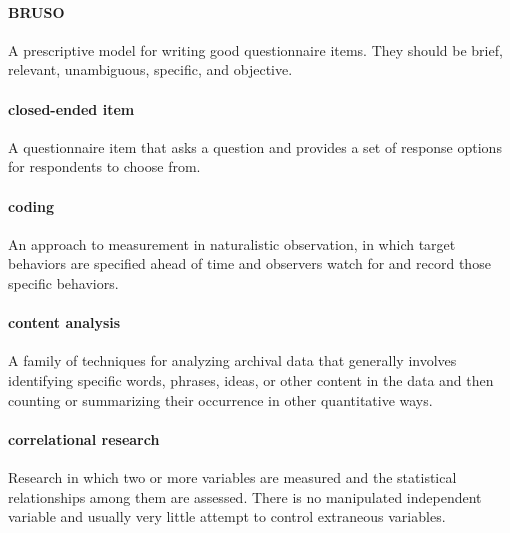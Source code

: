 \documentclass[
]{krantz}
\begin{document}
\hypertarget{bruso}{%
\paragraph*{BRUSO}\label{bruso}}

A prescriptive model for writing good questionnaire items. They should be brief, relevant, unambiguous, specific, and objective.

\hypertarget{closed-ended-item}{%
\paragraph*{closed-ended item}\label{closed-ended-item}}

A questionnaire item that asks a question and provides a set of response options for respondents to choose from.

\hypertarget{coding}{%
\paragraph*{coding}\label{coding}}

An approach to measurement in naturalistic observation, in which target behaviors are specified ahead of time and observers watch for and record those specific behaviors.

\hypertarget{content-analysis}{%
\paragraph*{content analysis}\label{content-analysis}}

A family of techniques for analyzing archival data that generally involves identifying specific words, phrases, ideas, or other content in the data and then counting or summarizing their occurrence in other quantitative ways.

\hypertarget{correlational-research-1}{%
\paragraph*{correlational research}\label{correlational-research-1}}

Research in which two or more variables are measured and the statistical relationships among them are assessed. There is no manipulated independent variable and usually very little attempt to control extraneous variables.
\end{document}
